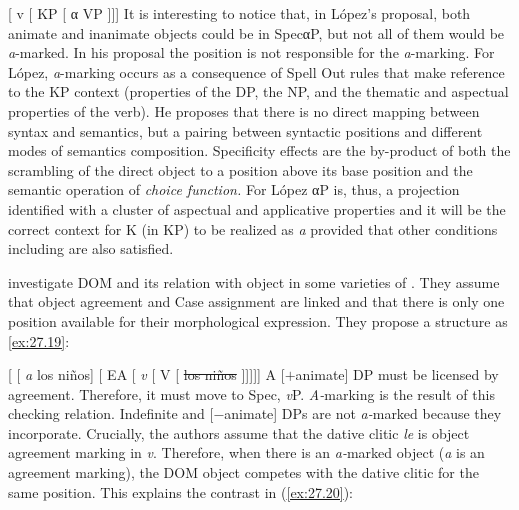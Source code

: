 \documentclass[output=paper]{langsci/langscibook}
\begin{document}
\ea\label{ex:27.18}
    {}[  v [  KP [  α  VP ]]]
\z
It is interesting to notice that, in López's proposal, both animate and
inanimate objects could be in SpecαP, but not all of them would be
\emph{a}{}-marked. In his proposal the position is not responsible for the
\emph{a}{}-marking. For López, \emph{a}{}-marking occurs as a consequence
of Spell Out rules that make reference to the KP context (properties of the DP,
the NP, and the thematic and aspectual properties of the verb). He proposes
that there is no direct mapping between syntax and semantics, but a pairing
between syntactic positions and different modes of semantics composition.
Specificity effects are the by-product of both the scrambling of the direct
object to a position above its base position and the semantic operation of
\emph{choice function.} For López αP is, thus, a projection
identified with a cluster of aspectual and applicative properties and it will
be the correct context for K (in KP) to be realized as \emph{a} provided that
other conditions including  are also satisfied.

\citet{OrmazabalRomero2013} investigate DOM and
its relation with object  in some varieties of . They assume that
object agreement and Case assignment are linked and that there is only one
position available for their morphological expression. They propose a structure
as \eqref{ex:27.19}:

\ea\label{ex:27.19}
    {}[ [ \emph{a} los niños]  [ \gls{EA}
    [ \emph{v} [  V  [ \sout{los niños} ]]]]]
\z
A [$+$animate] DP must be licensed by agreement. Therefore, it must move to
Spec, \emph{v}P. \emph{A-}marking is the result of this checking relation.
Indefinite and [$-$animate] DPs are not \emph{a-}marked because they
incorporate. Crucially, the authors assume that the dative clitic \emph{le} is
object agreement marking in \emph{v}. Therefore, when there is an
\emph{a-}marked object (\emph{a} is an agreement marking), the
DOM object competes with the dative clitic for
the same position. This explains the contrast in
(\ref{ex:27.20}):
\end{document}
